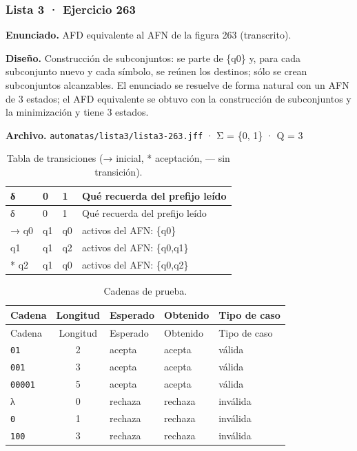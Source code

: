 
\hypertarget{lista-3-ejercicio-263}{%
\subsubsection{Lista 3 · Ejercicio 263}\label{lista-3-ejercicio-263}}

\textbf{Enunciado.} AFD equivalente al AFN de la figura 263 (transcrito).

\textbf{Diseño.} Construcción de subconjuntos: se parte de \{q0\} y, para cada subconjunto nuevo y cada símbolo, se reúnen los destinos; sólo se crean subconjuntos alcanzables. El enunciado se resuelve de forma natural con un AFN de 3 estados; el AFD equivalente se obtuvo con la construcción de subconjuntos y la minimización y tiene 3 estados.

\textbf{Archivo.} \texttt{automatas/lista3/lista3-263.jff} · Σ = \{0, 1\} · \textbar Q\textbar{} = 3

\begin{longtable}[]{@{}llll@{}}
\caption{Tabla de transiciones (→ inicial, * aceptación, --- sin transición).}\tabularnewline
\toprule\noalign{}
δ & 0 & 1 & Qué recuerda del prefijo leído \\
\midrule\noalign{}
\endfirsthead
\toprule\noalign{}
δ & 0 & 1 & Qué recuerda del prefijo leído \\
\midrule\noalign{}
\endhead
\bottomrule\noalign{}
\endlastfoot
→ q0 & q1 & q0 & activos del AFN: \{q0\} \\
q1 & q1 & q2 & activos del AFN: \{q0,q1\} \\
* q2 & q1 & q0 & activos del AFN: \{q0,q2\} \\
\end{longtable}

\begin{longtable}[]{@{}lclll@{}}
\caption{Cadenas de prueba.}\tabularnewline
\toprule\noalign{}
Cadena & Longitud & Esperado & Obtenido & Tipo de caso \\
\midrule\noalign{}
\endfirsthead
\toprule\noalign{}
Cadena & Longitud & Esperado & Obtenido & Tipo de caso \\
\midrule\noalign{}
\endhead
\bottomrule\noalign{}
\endlastfoot
\texttt{01} & 2 & acepta & acepta & válida \\
\texttt{001} & 3 & acepta & acepta & válida \\
\texttt{00001} & 5 & acepta & acepta & válida \\
λ & 0 & rechaza & rechaza & inválida \\
\texttt{0} & 1 & rechaza & rechaza & inválida \\
\texttt{100} & 3 & rechaza & rechaza & inválida \\
\end{longtable}

